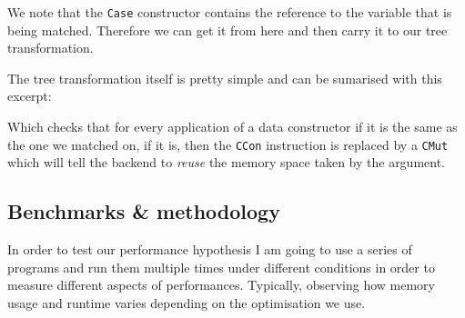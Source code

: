 \documentclass[
]{article}
\newenvironment{Shaded}{}{}
\newcommand{\DataTypeTok}[1]{\textcolor[rgb]{0.56,0.13,0.00}{#1}}
\newcommand{\FunctionTok}[1]{\textcolor[rgb]{0.02,0.16,0.49}{#1}}
\newcommand{\KeywordTok}[1]{\textcolor[rgb]{0.00,0.44,0.13}{\textbf{#1}}}
\newcommand{\NormalTok}[1]{#1}
\newcommand{\OperatorTok}[1]{\textcolor[rgb]{0.40,0.40,0.40}{#1}}
\newcommand{\OtherTok}[1]{\textcolor[rgb]{0.00,0.44,0.13}{#1}}
\begin{document}
We note that the \texttt{Case} constructor contains the reference to the
variable that is being matched. Therefore we can get it from here and
then carry it to our tree transformation.

The tree transformation itself is pretty simple and can be sumarised
with this excerpt:

\begin{Shaded}
\end{Shaded}

Which checks that for every application of a data constructor if it is
the same as the one we matched on, if it is, then the \texttt{CCon}
instruction is replaced by a \texttt{CMut} which will tell the backend
to \emph{reuse} the memory space taken by the argument.

\hypertarget{benchmarks-methodology}{%
\subsection{Benchmarks \& methodology}\label{benchmarks-methodology}}

In order to test our performance hypothesis I am going to use a series
of programs and run them multiple times under different conditions in
order to measure different aspects of performances. Typically, observing
how memory usage and runtime varies depending on the optimisation we
use.
\end{document}
